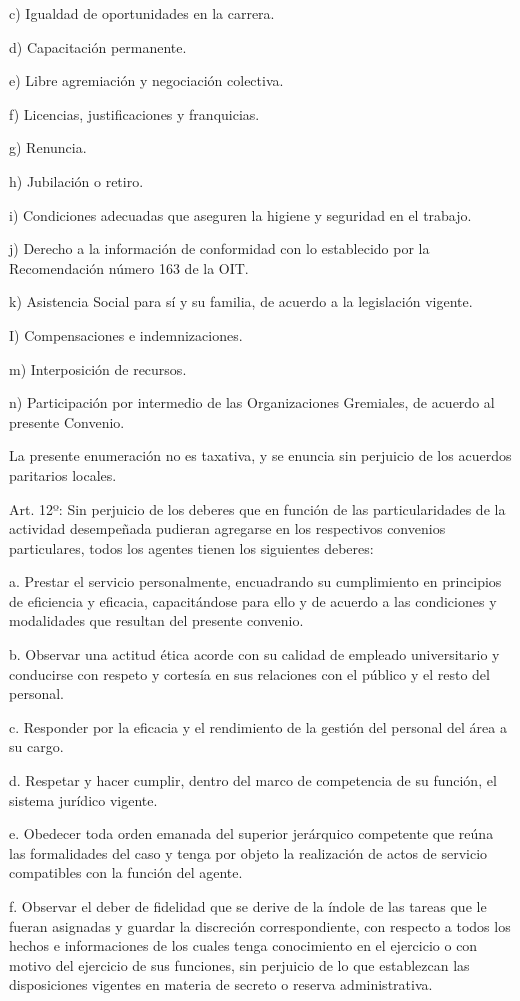 \documentclass[]{article}
\begin{document}
c) Igualdad de oportunidades en la carrera.

d) Capacitación permanente.

e) Libre agremiación y negociación colectiva.

f) Licencias, justificaciones y franquicias.

g) Renuncia.

h) Jubilación o retiro.

i) Condiciones adecuadas que aseguren la higiene y seguridad en el
trabajo.

j) Derecho a la información de conformidad con lo establecido por la
Recomendación número 163 de la OIT.

k) Asistencia Social para sí y su familia, de acuerdo a la legislación
vigente.

I) Compensaciones e indemnizaciones.

m) Interposición de recursos.

n) Participación por intermedio de las Organizaciones Gremiales, de
acuerdo al presente Convenio.

La presente enumeración no es taxativa, y se enuncia sin perjuicio de
los acuerdos paritarios locales.

Art. 12º: Sin perjuicio de los deberes que en función de las
particularidades de la actividad desempeñada pudieran agregarse en los
respectivos convenios particulares, todos los agentes tienen los
siguientes deberes:

a. Prestar el servicio personalmente, encuadrando su cumplimiento en
principios de eficiencia y eficacia, capacitándose para ello y de
acuerdo a las condiciones y modalidades que resultan del presente
convenio.

b. Observar una actitud ética acorde con su calidad de empleado
universitario y conducirse con respeto y cortesía en sus relaciones con
el público y el resto del personal.

c. Responder por la eficacia y el rendimiento de la gestión del personal
del área a su cargo.

d. Respetar y hacer cumplir, dentro del marco de competencia de su
función, el sistema jurídico vigente.

e. Obedecer toda orden emanada del superior jerárquico competente que
reúna las formalidades del caso y tenga por objeto la realización de
actos de servicio compatibles con la función del agente.

f. Observar el deber de fidelidad que se derive de la índole de las
tareas que le fueran asignadas y guardar la discreción correspondiente,
con respecto a todos los hechos e informaciones de los cuales tenga
conocimiento en el ejercicio o con motivo del ejercicio de sus
funciones, sin perjuicio de lo que establezcan las disposiciones
vigentes en materia de secreto o reserva administrativa.
\end{document}
